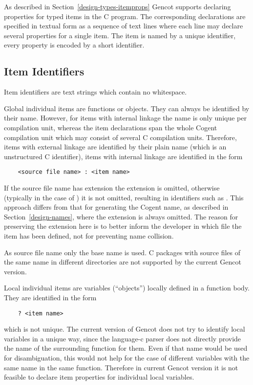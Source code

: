 As described in Section~\ref{design-types-itemprops} Gencot supports declaring properties for typed 
items in the C program. The corresponding declarations are specified in textual form as a sequence
of text lines where each line may declare several properties for a single item. The item is
named by a unique identifier, every property is encoded by a short identifier.

\subsection{Item Identifiers}
\label{impl-itemprops-ids}

Item identifiers are text strings which contain no whitespace. 

Global individual items are functions or objects.
They can always be identified by their name. However, for items with internal linkage the name is only unique
per compilation unit, whereas the item declarations span the whole Cogent compilation unit which may consist of several C 
compilation units. Therefore, items with 
external linkage are identified by their plain name (which is an unstructured C identifier), items with
internal linkage are identified in the form
\begin{verbatim}
    <source file name> : <item name>
\end{verbatim}
If the source file name has extension  the extension is omitted, otherwise (typically in the case of )
it is not omitted, resulting in identifiers such as . This approach differs from that for generating the 
Cogent name, as described in Section~\ref{design-names}, where the extension is always omitted. The reason for preserving
the extension here is to better inform the developer in which file the item has been defined, not for preventing name collision.

As source file name only the base name is used. C packages with source files of the same name in different directories are
not supported by the current Gencot version.

Local individual items are variables (``objects'') locally defined in a function body. They are identified in the form
\begin{verbatim}
    ? <item name>
\end{verbatim}
which is not unique. The current version of Gencot does not try to identify local variables in a unique way, since the 
language-c parser does not directly provide the name of the surrounding function for them. Even if that name would be
used for disambiguation, this would not help for the case of different variables with the same name in the same function.
Therefore in current Gencot version it is not feasible to declare item properties for individual local variables. 

